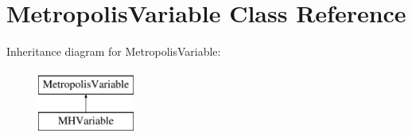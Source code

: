 \hypertarget{class_metropolis_variable}{\section{Metropolis\-Variable Class Reference}
\label{class_metropolis_variable}
}
Inheritance diagram for Metropolis\-Variable\-:\begin{figure}[H]
\begin{center}
\leavevmode
\includegraphics[height=2.000000cm]{class_metropolis_variable}
\end{center}
\end{figure}
